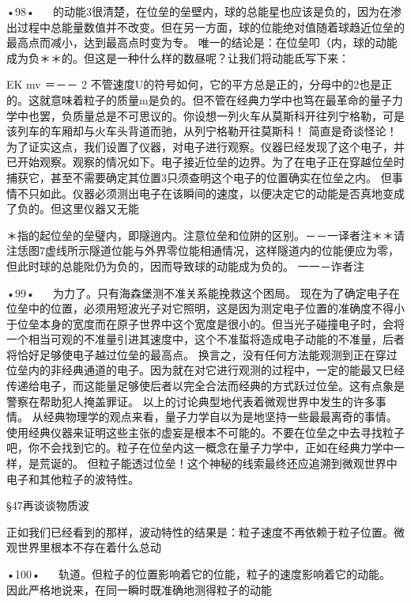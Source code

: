 •98•
  
的动能3很清楚，在位垒的垒壁内，球的总能星也应该是负的，因为在渗出过程中总能量数值并不改变。但在另一方面，球的位能绝对值随着球趋近位垒的最高点而减小，达到最高点时变为专。
唯一的结论是：在位垒叩（内，球的动能成为负＊＊的。但这是一种什么样的数昼呢？让我们将动能氐写下来：

EK
mv
＝－－
2
不管速度U的符号如何，它的平方总是正的，分母中的2也是正的。这就意味着粒子的质量m是负的。但不管在经典力学中也笃在最革命的量子力学中也罢，负质量总是不可思议的。你设想一列火车从莫斯科开往列宁格勒，可是该列车的车厢却与火车头背道而驰，从列宁格勒开往莫斯科！
简直是奇谈怪论！为了证实这点，我们设置了仪器，对电子进行观察。仪器巳经发现了这个电子，并已开始观察。观察的情况如下。电子接近位垒的边界。为了在电子正在穿越位垒时捕获它，甚至不需要确定其位置3只须查明这个电子的位置确实在位垒之内。
但事情不只如此。仪器必须测出电子在该瞬间的速度，以便决定它的动能是否真地变成了负的。但这里仪器又无能

＊指的起位垒的垒璧内，即隧逍内。注意位垒和位阱的区别。－－一译者注＊＊请注恁图7虚线所示隧道位能与外界零位能相通情况，这样隧道内的位能便应为零，但此时球的总能阰仍为负的，因而导致球的动能成为负的。
一一－诈者注

•99•
  
为力了。只有海森堡测不准关系能挽救这个困局。
现在为了确定电子在位垒中的位置，必须用短波光子对它照明，这是因为测定电子位置的准确度不得小于位垒本身的宽度而在原子世界中这个宽度是很小的。但当光子碰撞电子时，会将一个相当可观的不准量引进其速度中，这个不准蜇将造成电子动能的不准量，后者将恰好足够使电子越过位垒的最高点。
换言之，没有任何方法能观测到正在穿过位垒内的非经典通道的电子。因为就在对它进行观测的过程中，一定的能最又巳经传递给电子，而这能量足够使后者以完全合法而经典的方式跃过位垒。这有点象是警察在帮助犯人掩盖罪证。
以上的讨论典型地代表着微观世界中发生的许多事情。
从经典物理学的观点来看，量子力学自以为是地坚持一些最最离奇的事情。使用经典仪器来证明这些主张的虚妄是根本不可能的。不要在位垒之中去寻找粒子吧，你不会找到它的。粒子在位垒内这一概念在量子力学中，正如在经典力学中一样，是荒诞的。
但粒子能透过位垒！这个神秘的线索最终还应追溯到微观世界中电子和其他粒子的波特性。

§47再谈谈物质波

正如我们已经看到的那样，波动特性的结果是：粒子速度不再依赖于粒子位置。微观世界里根本不存在着什么总动

•100•
  
轨道。但粒子的位置影响着它的位能，粒子的速度影响着它的动能。
因此严格地说来，在同一瞬时既准确地测得粒子的动能

